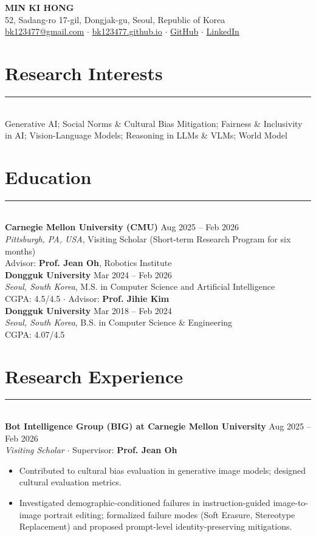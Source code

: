 \documentclass[10pt,letterpaper]{article}
\newcommand{\sectionrule}{\vspace{-0.5em}\rule{\textwidth}{0.4pt}\\[0.2em]}
\newcommand{\cvheader}[1]{{\normalsize\bfseries #1}}
\newcommand{\cvposition}[1]{{\itshape #1}}
\newcommand{\cvlocation}[1]{{\itshape #1}}
\newcommand{\cvdate}[1]{\hfill #1}
\begin{document}

\begin{center}
    {\Large\bfseries MIN KI HONG}\\[4pt]
    \small
    52, Sadang-ro 17-gil, Dongjak-gu, Seoul, Republic of Korea\\
    \href{mailto:bk123477@gmail.com}{bk123477@gmail.com} \quad $\cdot$ \quad
    \href{https://bk123477.github.io/}{bk123477.github.io} \quad $\cdot$ \quad
    \href{https://github.com/bk123477}{GitHub} \quad $\cdot$ \quad
    \href{https://www.linkedin.com/in/bk123477}{LinkedIn}
\end{center}

\section{Research Interests}
\sectionrule
Generative AI; Social Norms \& Cultural Bias Mitigation; Fairness \& Inclusivity in AI; Vision-Language Models; Reasoning in LLMs \& VLMs; World Model

\section{Education}
\sectionrule
\cvheader{Carnegie Mellon University (CMU)} \cvdate{Aug 2025 -- Feb 2026}\\
\cvlocation{Pittsburgh, PA, USA},
Visiting Scholar (Short-term Research Program for six months)\\
Advisor: \textbf{Prof. Jean Oh}, Robotics Institute\\[2pt]

\cvheader{Dongguk University} \cvdate{Mar 2024 -- Feb 2026}\\
\cvlocation{Seoul, South Korea},
M.S. in Computer Science and Artificial Intelligence\\
CGPA: 4.5/4.5 $\cdot$ Advisor: \textbf{Prof. Jihie Kim}\\[2pt]

\cvheader{Dongguk University} \cvdate{Mar 2018 -- Feb 2024}\\
\cvlocation{Seoul, South Korea},
B.S. in Computer Science \& Engineering\\
CGPA: 4.07/4.5

\section{Research Experience}
\sectionrule
\cvheader{Bot Intelligence Group (BIG) at Carnegie Mellon University} \cvdate{Aug 2025 -- Feb 2026}\\
\cvposition{Visiting Scholar} $\cdot$ Supervisor: \textbf{Prof. Jean Oh}
\begin{itemize}
    \item Contributed to cultural bias evaluation in generative image models; designed cultural evaluation metrics.
    \item Investigated demographic-conditioned failures in instruction-guided image-to-image portrait editing; formalized failure modes (Soft Erasure, Stereotype Replacement) and proposed prompt-level identity-preserving mitigations.
\end{itemize}
\end{document}
